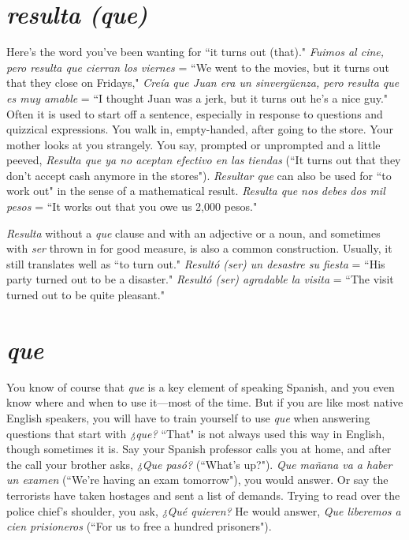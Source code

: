 \section{\emph{resulta (que)}}

Here's the word you've been wanting for ``it turns out (that)."
\emph{Fuimos al cine, pero resulta que cierran los viernes} = ``We went to
the movies, but it turns out that they close on Fridays," \emph{Creía que
	Juan era un sinvergüenza, pero resulta que es muy amable} = ``I
thought Juan was a jerk, but it turns out he's a nice guy." Often it is
used to start off a sentence, especially in response to questions and
quizzical expressions. You walk in, empty-handed, after going to the
store. Your mother looks at you strangely. You say, prompted or unprompted and a little peeved, \emph{Resulta que ya no aceptan efectivo en
	las tiendas} (``It turns out that they don't accept cash anymore in the
stores"). \emph{Resultar que} can also be used for ``to work out" in the sense
of a mathematical result. \emph{Resulta que nos debes dos mil pesos} = ``It
works out that you owe us 2,000 pesos."

\emph{Resulta} without a \emph{que} clause and with an adjective or a noun,
and sometimes with \emph{ser} thrown in for good measure, is also a common
construction. Usually, it still translates well as ``to turn out." \emph{Resultó
	(ser) un desastre su fiesta} = ``His party turned out to be a disaster."
\emph{Resultó (ser) agradable la visita} = ``The visit turned out to be quite
pleasant."

\section{\emph{que}}

You know of course that \emph{que} is a key element of speaking
Spanish, and you even know where and when to use it---most of the
time. But if you are like most native English speakers, you will have
to train yourself to use \emph{que} when answering questions that start with
\emph{¿que?} ``That" is not always used this way in English, though sometimes it is. Say your Spanish professor calls you at home, and after the
call your brother asks, \emph{¿Que pasó?} (``What's up?"). \emph{Que mañana va a
	haber un examen} (``We're having an exam tomorrow"), you would answer. Or say the terrorists have taken hostages and sent a list of demands. Trying to read over the police chief's shoulder, you ask, \emph{¿Qué
	quieren?} He would answer, \emph{Que liberemos a cien prisioneros} (``For us
to free a hundred prisoners").

